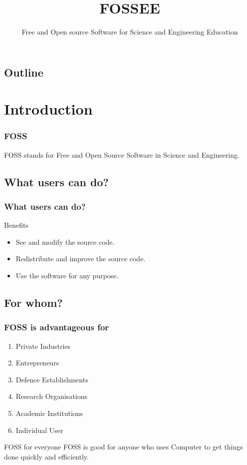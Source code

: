 \documentclass[compress,red]{beamer} %
\title{FOSSEE}
\subtitle{Free and Open source Software for Science and Engineering
Education}
\author[]{}  %
\institute{IIT Bombay}
\date[]{} %
\begin{document}
\begin{frame}
	 \titlepage
\end{frame}

\begin{frame}
\section*{Outline}
\tableofcontents
\end{frame}


\section{Introduction}
\begin{frame}
\frametitle{FOSS}
\begin{definition}
\alert{FOSS} stands for Free and Open Source Software in Science and Engineering.
\end{definition}
\end{frame}

\subsection{What users can do?}
\begin{frame}
\frametitle{What users can do?}
\begin{block}{Benefits}
\begin{itemize}
\item See and modify the source code.\pause
\item Redistribute and improve the source code.\pause
\item Use the software for any purpose.\pause
\end{itemize}
\end{block}
\end{frame}

\subsection{For whom?}
\begin{frame}
\frametitle{FOSS is advantageous for}
\begin{enumerate}
\item Private Industries \pause
\item Entrepreneurs \pause
\item Defence Establishments \pause
\item Research Organisations \pause
\item Academic Institutions\pause
\item Individual User \pause
\end{enumerate}
\begin{block}{FOSS for everyone}
FOSS is good for anyone who uses Computer to get things done quickly and efficiently. 
\end{block}
\end{frame}
\end{document}
